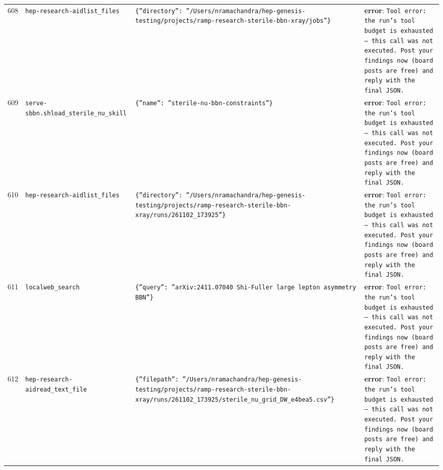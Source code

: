 \documentclass[11pt,a4paper]{article}
\begin{document}
\begin{longtable}{@{}p{}p{}p{}p{}@{}}
608 & \texttt{hep-research-aid}\newline\texttt{list\_\allowbreak{}files} & \texttt{\{''directory'':\allowbreak{} ''/\allowbreak{}Users/\allowbreak{}nramachandra/\allowbreak{}hep-genesis-testing/\allowbreak{}projects/\allowbreak{}ramp-research-sterile-bbn-xray/\allowbreak{}jobs''\}\allowbreak{}} & \textbf{error}: \texttt{Tool error:\allowbreak{} the run's tool budget is exhausted --- this call was not executed. Post your findings now (board posts are free)\allowbreak{} and reply with the final JSON.} \\
609 & \texttt{serve-sbbn.sh}\newline\texttt{load\_\allowbreak{}sterile\_\allowbreak{}nu\_\allowbreak{}skill} & \texttt{\{''name'':\allowbreak{} ''sterile-nu-bbn-constraints''\}\allowbreak{}} & \textbf{error}: \texttt{Tool error:\allowbreak{} the run's tool budget is exhausted --- this call was not executed. Post your findings now (board posts are free)\allowbreak{} and reply with the final JSON.} \\
610 & \texttt{hep-research-aid}\newline\texttt{list\_\allowbreak{}files} & \texttt{\{''directory'':\allowbreak{} ''/\allowbreak{}Users/\allowbreak{}nramachandra/\allowbreak{}hep-genesis-testing/\allowbreak{}projects/\allowbreak{}ramp-research-sterile-bbn-xray/\allowbreak{}runs/\allowbreak{}261102\_\allowbreak{}173925''\}\allowbreak{}} & \textbf{error}: \texttt{Tool error:\allowbreak{} the run's tool budget is exhausted --- this call was not executed. Post your findings now (board posts are free)\allowbreak{} and reply with the final JSON.} \\
611 & \texttt{local}\newline\texttt{web\_\allowbreak{}search} & \texttt{\{''query'':\allowbreak{} ''arXiv:\allowbreak{}2411.07040 Shi-Fuller large lepton asymmetry BBN''\}\allowbreak{}} & \textbf{error}: \texttt{Tool error:\allowbreak{} the run's tool budget is exhausted --- this call was not executed. Post your findings now (board posts are free)\allowbreak{} and reply with the final JSON.} \\
612 & \texttt{hep-research-aid}\newline\texttt{read\_\allowbreak{}text\_\allowbreak{}file} & \texttt{\{''filepath'':\allowbreak{} ''/\allowbreak{}Users/\allowbreak{}nramachandra/\allowbreak{}hep-genesis-testing/\allowbreak{}projects/\allowbreak{}ramp-research-sterile-bbn-xray/\allowbreak{}runs/\allowbreak{}261102\_\allowbreak{}173925/\allowbreak{}sterile\_\allowbreak{}nu\_\allowbreak{}grid\_\allowbreak{}DW\_\allowbreak{}e4bea5.csv''\}\allowbreak{}} & \textbf{error}: \texttt{Tool error:\allowbreak{} the run's tool budget is exhausted --- this call was not executed. Post your findings now (board posts are free)\allowbreak{} and reply with the final JSON.} \\

\end{longtable}
\end{document}
